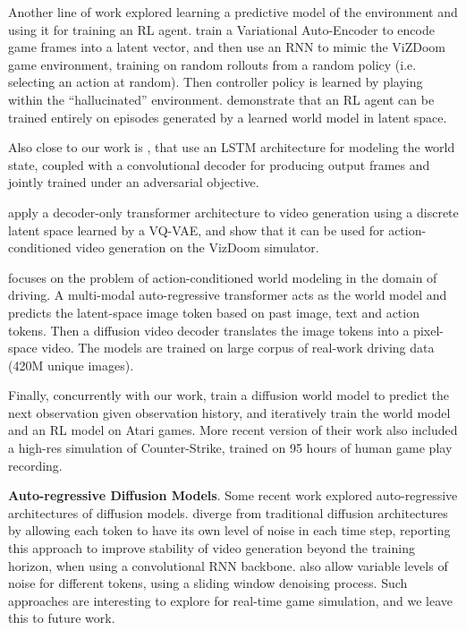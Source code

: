 \documentclass{article} %
\begin{document}
Another line of work explored learning a predictive model of the environment and using it for training an RL agent. \cite{ha2018worldmodels} train a Variational Auto-Encoder \citep{Kingma2014} to encode game frames into a latent vector, and then use an RNN to mimic the ViZDoom game environment, training on random rollouts from a random policy (i.e. selecting an action at random). Then controller policy is learned by playing within the ``hallucinated'' environment. \cite{hafner2020dreamer} demonstrate that an RL agent can be trained entirely on episodes generated by a learned world model in latent space.

Also close to our work is \cite{Kim2020_GameGan}, that use an LSTM architecture for modeling the world state, coupled with a convolutional decoder for producing output frames and jointly trained under an adversarial objective. 

\cite{yan2021videogpt} apply a decoder-only transformer architecture to video generation using a discrete latent space learned by a VQ-VAE, and show that it can be used for action-conditioned video generation on the VizDoom simulator. 

\cite{gaia2023} focuses on the problem of action-conditioned world modeling in the domain of driving. A multi-modal auto-regressive transformer acts as the world model and predicts the latent-space image token based on past image, text and action tokens. Then a diffusion video decoder translates the image tokens into a pixel-space video. The models are trained on large corpus of real-work driving data (420M unique images). 

Finally, concurrently with our work, \cite{alonso2024diffusion} train a diffusion world model to predict the next observation given observation history, and iteratively train the world model and an RL model on Atari games. More recent version of their work also included a high-res simulation of Counter-Strike, trained on 95 hours of human game play recording. 

\textbf{Auto-regressive Diffusion Models}. Some recent work explored auto-regressive architectures of diffusion models. \cite{chen2024diffusionforcingnexttokenprediction} diverge from traditional diffusion architectures by allowing each token to have its own level of noise in each time step, reporting this approach to improve stability of video generation beyond the training horizon, when using a convolutional RNN backbone. \cite{rollingdiffusion2024} also allow variable levels of noise for different tokens, using a sliding window denoising process. Such approaches are interesting to explore for real-time game simulation, and we leave this to future work.
\end{document}
